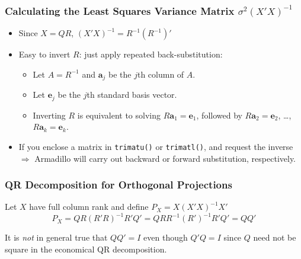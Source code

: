 \begin{frame}
  \frametitle{Calculating the Least Squares Variance Matrix $\sigma^2 (X'X)^{-1}$}
  \begin{itemize}
    \item Since $X = QR$, $(X'X)^{-1} = R^{-1} (R^{-1})'$
    \item Easy to invert $R$: just apply \alert{repeated} back-substitution:
      \begin{itemize}
        \item Let $A = R^{-1}$ and $\mathbf{a}_j$ be the $j$th column of $A$.
        \item Let $\mathbf{e}_j$ be the $j$th standard basis vector.
        \item Inverting $R$ is equivalent to solving $R \mathbf{a}_1 = \mathbf{e}_1$, followed by $R \mathbf{a}_2 = \mathbf{e}_2$, \dots, $R \mathbf{a}_k = \mathbf{e}_k$.
      \end{itemize}
    \item If you enclose a matrix in \texttt{trimatu()} or \texttt{trimatl()}, and request the inverse $\Rightarrow$ Armadillo will carry out backward or forward substitution, respectively.
  \end{itemize}

\end{frame}
\begin{frame}
  \frametitle{QR Decomposition for Orthogonal Projections}

Let $X$ have full column rank and define $P_X = X (X'X)^{-1}X'$
  $$P_X  = QR(R'R)^{-1}R'Q' = QRR^{-1} (R')^{-1}R'Q' = QQ'$$

  It is \emph{not} in general true that $QQ' = I$ even though $Q'Q = I$ since $Q$ need not be square in the economical QR decomposition. 

\end{frame}




